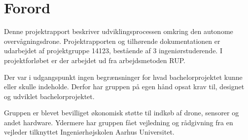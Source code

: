 \chapter{Forord}

Denne projektrapport beskriver udviklingsprocessen omkring den autonome overvågningsdrone. Projektrapporten og tilhørende dokumentationen er udarbejdet af projektgruppe 14123, bestående af 3 ingeniørstuderende. I projektforløbet er der arbejdet ud fra arbejdsmetoden RUP. 

Der var i udgangspunkt ingen begrænsninger for hvad bachelorprojektet kunne eller skulle indeholde. Derfor har gruppen på egen hånd opsat krav til, designet og udviklet bachelorprojektet. 

Gruppen er blevet bevilliget økonomisk støtte til indkøb af drone, sensorer og andet hardware. Ydermere har gruppen fået vejledning og rådgivning fra en vejleder tilknyttet Ingeniørhøjskolen Aarhus Universitet.  